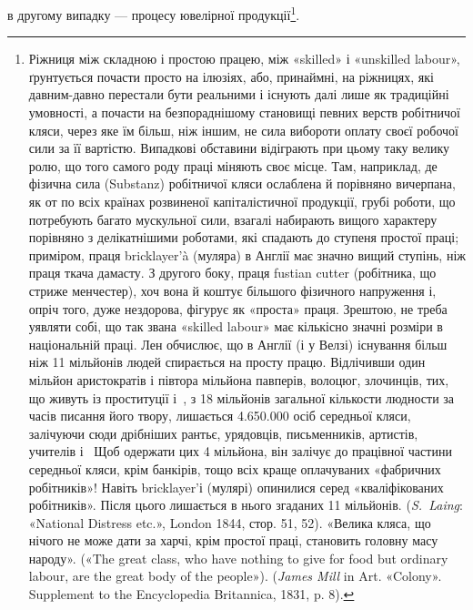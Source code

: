 в другому випадку — процесу ювелірної продукції\footnote{
Ріжниця між складною і простою працею, між «skilled» і «unskilled
labour», ґрунтується почасти просто на ілюзіях, або, принаймні,
на ріжницях, які давним-давно перестали бути реальними і існують далі
лише як традиційні умовності, а почасти на безпораднішому становищі
певних верств робітничої кляси, через яке їм більш, ніж іншим, не сила
вибороти оплату своєї робочої сили за її вартістю. Випадкові обставини
відіграють при цьому таку велику ролю, що того самого роду праці міняють
своє місце. Там, наприклад, де фізична сила (Substanz) робітничої кляси
ослаблена й порівняно вичерпана, як от по всіх країнах розвиненої капіталістичної
продукції, грубі роботи, що потребують багато мускульної сили,
взагалі набирають вищого характеру порівняно з делікатнішими роботами,
які спадають до ступеня простої праці; приміром, праця bricklayer’à (муляра)
в Англії має значно вищий ступінь, ніж праця ткача дамасту.
З другого боку, праця fustian cutter (робітника, що стриже менчестер),
хоч вона й коштує більшого фізичного напруження і, опріч того, дуже нездорова,
фігурує як «проста» праця. Зрештою, не треба уявляти собі, що
так звана «skilled labour» має кількісно значні розміри в національній
праці. Лен обчислює, що в Англії (і у Велзі) існування більш ніж
11 мільйонів людей спирається на просту працю. Відлічивши один мільйон
аристократів і півтора мільйона павперів, волоцюг, злочинців, тих, що
живуть із проституції і~, з 18 мільйонів загальної кількости людности
за часів писання його твору, лишається \num{4.650.000} осіб середньої
кляси, залічуючи сюди дрібніших рантьє, урядовців, письменників,
артистів, учителів і~ Щоб одержати цих 4 мільйона, він залічує до
працівної частини середньої кляси, крім банкірів, тощо всіх краще оплачуваних
«фабричних робітників»! Навіть bricklayer’і (мулярі) опинилися
серед «кваліфікованих робітників». Після цього лишається в нього
згаданих 11 мільйонів. (\emph{S.~Laing}: «National Distress etc.», London
1844, стор. 51, 52). «Велика кляса, що нічого не може дати за харчі,
крім простої праці, становить головну масу народу». («The great class,
who have nothing to give for food but ordinary labour, are the great body
of the people»). (\emph{James Mill} in Art. «Colony». Supplement to the Encyclopedia
Britannica, 1831, p. 8).
}.

